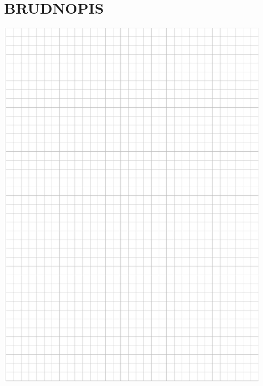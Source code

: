 \documentclass[10pt]{article}
\begin{document}
\section*{BRUDNOPIS}
\begin{center}
\includegraphics[max width=\textwidth]{2024_11_21_b8ac5f500a5bbb1b4ec5g-09}
\end{center}
\end{document}
